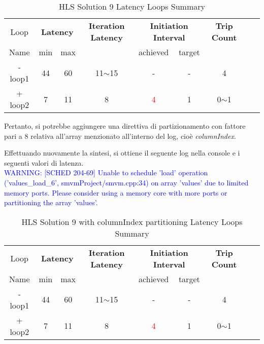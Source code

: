 \begin{table}[H]
	\centering
	\begin{tabular}{|c|c|c|c|c|c|c|c|c|}
		\hline
		\multicolumn{1}{|c|}{Loop} & \multicolumn{2}{|c|}{\textbf{Latency}} & \multicolumn{1}{c|}{\textbf{Iteration Latency}} & \multicolumn{2}{c|}{\textbf{Initiation Interval}} & \multicolumn{1}{c|}{\textbf{Trip Count}}  \\
		Name & min & max &  & achieved & target &  \\
		\hline
		- loop1 & 44 & 60 & 11$\sim$15 & - & - & 4 \\
		+ loop2 & 7 & 11 & 8 & \textcolor{red}{4} & 1 & 0$\sim$1 \\
		\hline
	\end{tabular}
	\caption{HLS Solution 9 Latency Loops Summary}
	\label{tab:hls-solution-9-loop-summary}
\end{table}

Pertanto, si potrebbe aggiungere una direttiva di partizionamento con fattore pari a 8 relativa all'array menzionato all'interno del log, cioè \textit{columnIndex}.



Effettuando nuovamente la sintesi, si ottiene il seguente log nella console e i seguenti valori di latenza.
\\
\textcolor{blue}{WARNING: [SCHED 204-69] Unable to schedule 'load' operation ('values\_load\_6', smvmProject/smvm.cpp:34) on array 'values' due to limited memory ports. Please consider using a memory core with more ports or partitioning the array 'values'.}

\begin{table}[H]
	\centering
	\begin{tabular}{|c|c|c|c|c|c|c|c|c|}
		\hline
		\multicolumn{1}{|c|}{Loop} & \multicolumn{2}{|c|}{\textbf{Latency}} & \multicolumn{1}{c|}{\textbf{Iteration Latency}} & \multicolumn{2}{c|}{\textbf{Initiation Interval}} & \multicolumn{1}{c|}{\textbf{Trip Count}}  \\
		Name & min & max &  & achieved & target &  \\
		\hline
		- loop1 & 44 & 60 & 11$\sim$15 & - & - & 4 \\
		+ loop2 & 7 & 11 & 8 & \textcolor{red}{4} & 1 & 0$\sim$1 \\
		\hline
	\end{tabular}
	\caption{HLS Solution 9 with columnIndex partitioning Latency Loops Summary}
	\label{tab:hls-solution-9-columnindex-partitioning-loop-summary}
\end{table}

